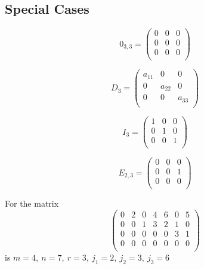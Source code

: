 \subsection{Special Cases}
\begin{example}
   \[0_{3,3} = \begin{pmatrix}
      0 & 0 & 0 \\
      0 & 0 & 0 \\
      0 & 0 & 0 \\
   \end{pmatrix}\]
\end{example}
\begin{example}
   \[D_{3} = \begin{pmatrix}
         a_{11} & 0 & 0 \\
         0 & a_{22} & 0 \\
         0 & 0 & a_{33} \\
   \end{pmatrix}\]
\end{example}
\begin{example}
   \[I_{3} = \begin{pmatrix}
         1 & 0 & 0 \\
         0 & 1 & 0 \\
         0 & 0 & 1 \\
   \end{pmatrix}\]
\end{example}
\begin{example}
   \[E_{2,3} = \begin{pmatrix}
         0 & 0 & 0 \\
         0 & 0 & 1 \\
         0 & 0 & 0 \\
   \end{pmatrix}\]
\end{example}

\begin{example}
   For the matrix
   \[\begin{pmatrix}
         0 & 2 & 0 & 4 & 6 & 0 & 5 \\
         0 & 0 & 1 & 3 & 2 & 1 & 0 \\
         0 & 0 & 0 & 0 & 0 & 3 & 1 \\
         0 & 0 & 0 & 0 & 0 & 0 & 0 \\
   \end{pmatrix}\]
   is \(m = 4,~n = 7,~r = 3,~j_1 = 2,~j_2 = 3,~j_3 = 6\)
\end{example}

